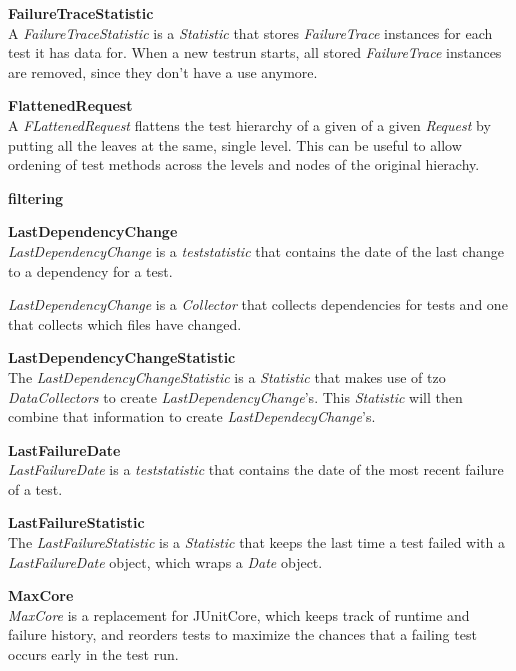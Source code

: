 \documentclass[i2]{oss}
\newcommand{\class}[1]{\emph{#1}}
\newcommand{\gloss}[1]{\textbf{#1}}
\begin{document}
\begin{description}
\item \gloss{FailureTraceStatistic}\\
A \class{FailureTraceStatistic} is a \class{Statistic} that stores \class{FailureTrace} instances for each test it has data for. When a new testrun starts, all stored \class{FailureTrace} instances are removed, since they don't have a use anymore.
	

\item \gloss{FlattenedRequest}\\
A \class{FLattenedRequest} flattens the test hierarchy of a given of a given \class{Request} by putting all the leaves at the same, single level. This can be useful to allow ordening of test methods across the levels and nodes of the original hierachy.

\item \gloss{filtering}\\


\item \gloss{LastDependencyChange} \\
\class{LastDependencyChange} is a \class{teststatistic} that contains the date of the last change to a dependency for a test.

\class{LastDependencyChange} is a \class{Collector} that collects dependencies for tests and one that collects which files have changed.

\item \gloss{LastDependencyChangeStatistic} \\

The \class{LastDependencyChangeStatistic} is a \class{Statistic} that makes use of tzo \class{DataCollectors} to create \class{LastDependencyChange}'s. This \class{Statistic} will then combine that information to create \class{LastDependecyChange}'s.

\item \gloss{LastFailureDate} \\
\class{LastFailureDate} is a \class{teststatistic} that contains the date of the most recent failure of a test.

\item \gloss{LastFailureStatistic}\\
 The \class{LastFailureStatistic} is a \class{Statistic} that keeps the last time a test failed with a \class{LastFailureDate} object, which wraps a \class{Date} object.

\item \gloss{MaxCore} \\
\class{MaxCore} is a replacement for JUnitCore, which keeps track of runtime and failure history, and reorders tests to maximize the chances that a failing test occurs early in the test run.


\end{description}
\end{document}
